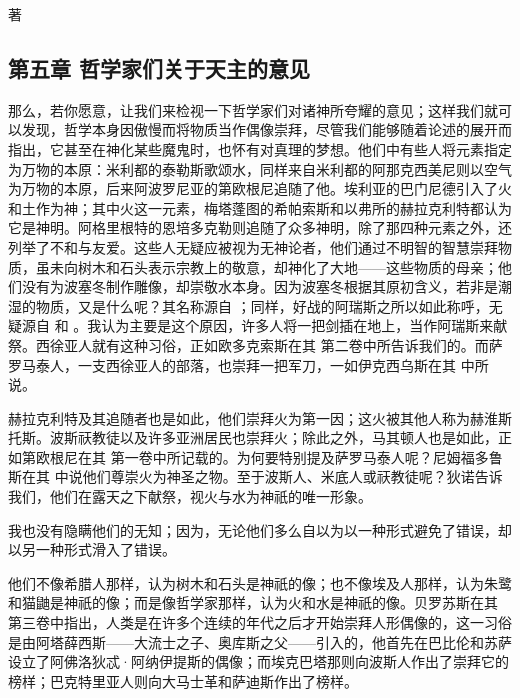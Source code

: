  著\par


\subsection{第五章 哲学家们关于天主的意见}

那么，若你愿意，让我们来检视一下哲学家们对诸神所夸耀的意见；这样我们就可以发现，哲学本身因傲慢而将物质当作偶像崇拜，尽管我们能够随着论述的展开而指出，它甚至在神化某些魔鬼时，也怀有对真理的梦想。他们中有些人将元素指定为万物的本原：米利都的泰勒斯歌颂水，同样来自米利都的阿那克西美尼则以空气为万物的本原，后来阿波罗尼亚的第欧根尼追随了他。埃利亚的巴门尼德引入了火和土作为神；其中火这一元素，梅塔蓬图的希帕索斯和以弗所的赫拉克利特都认为它是神明。阿格里根特的恩培多克勒则追随了众多神明，除了那四种元素之外，还列举了不和与友爱。这些人无疑应被视为无神论者，他们通过不明智的智慧崇拜物质，虽未向树木和石头表示宗教上的敬意，却神化了大地——这些物质的母亲；他们没有为波塞冬制作雕像，却崇敬水本身。因为波塞冬根据其原初含义，若非是潮湿的物质，又是什么呢？其名称源自 ；同样，好战的阿瑞斯之所以如此称呼，无疑源自  和 。我认为主要是这个原因，许多人将一把剑插在地上，当作阿瑞斯来献祭。西徐亚人就有这种习俗，正如欧多克索斯在其  第二卷中所告诉我们的。而萨罗马泰人，一支西徐亚人的部落，也崇拜一把军刀，一如伊克西乌斯在其  中所说。\par

赫拉克利特及其追随者也是如此，他们崇拜火为第一因；这火被其他人称为赫淮斯托斯。波斯祆教徒以及许多亚洲居民也崇拜火；除此之外，马其顿人也是如此，正如第欧根尼在其  第一卷中所记载的。为何要特别提及萨罗马泰人呢？尼姆福多鲁斯在其  中说他们尊崇火为神圣之物。至于波斯人、米底人或祆教徒呢？狄诺告诉我们，他们在露天之下献祭，视火与水为神祇的唯一形象。\par

我也没有隐瞒他们的无知；因为，无论他们多么自以为以一种形式避免了错误，却以另一种形式滑入了错误。\par

他们不像希腊人那样，认为树木和石头是神祇的像；也不像埃及人那样，认为朱鹭和猫鼬是神祇的像；而是像哲学家那样，认为火和水是神祇的像。贝罗苏斯在其  第三卷中指出，人类是在许多个连续的年代之后才开始崇拜人形偶像的，这一习俗是由阿塔薛西斯——大流士之子、奥库斯之父——引入的，他首先在巴比伦和苏萨设立了阿佛洛狄忒·阿纳伊提斯的偶像；而埃克巴塔那则向波斯人作出了崇拜它的榜样；巴克特里亚人则向大马士革和萨迪斯作出了榜样。\par

